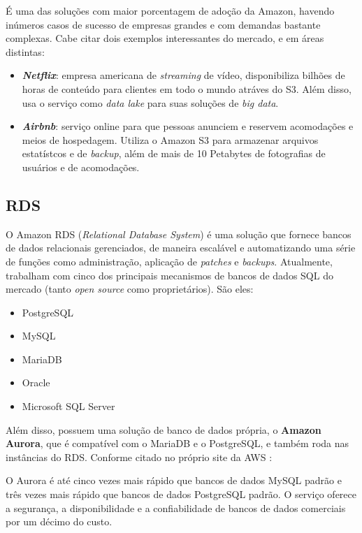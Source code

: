 É uma das soluções com maior porcentagem de adoção da Amazon, havendo inúmeros casos de sucesso de empresas grandes e com demandas bastante complexas. Cabe citar dois exemplos interessantes do mercado, e em áreas distintas: 
\begin{itemize}
  \item{\textit{\textbf{Netflix}}: empresa americana de \textit{streaming} de vídeo, disponibiliza bilhões de horas de conteúdo para clientes em todo o mundo atráves do S3. Além disso, usa o serviço como \textit{data lake} para suas soluções de \textit{big data}}.
  \item{\textit{\textbf{Airbnb}}: serviço online para que pessoas anunciem e reservem acomodações e meios de hospedagem. Utiliza o Amazon S3 para armazenar arquivos estatístcos e de \textit{backup}, além de mais de 10 Petabytes de fotografias de usuários e de acomodações.}
\end{itemize}

\subsection{RDS}

O Amazon RDS (\textit{Relational Database System}) é uma solução que fornece bancos de dados relacionais gerenciados, de maneira escalável e automatizando uma série de funções como administração, aplicação de \textit{patches} e \textit{backups}. Atualmente, trabalham com cinco dos principais mecanismos de bancos de dados SQL do mercado (tanto \textit{open source} como proprietários). São eles: 

\begin{itemize}
  \item{PostgreSQL}
  \item{MySQL}
  \item{MariaDB}
  \item{Oracle}
  \item{Microsoft SQL Server}
\end{itemize}

Além disso, possuem uma solução de banco de dados própria, o \textbf{Amazon Aurora}, que é compatível com o MariaDB e o PostgreSQL, e também roda nas instâncias do RDS. Conforme citado no próprio site da AWS \cite{aws-aurora}:

\begin{citacaoLonga}
O Aurora é até cinco vezes mais rápido que bancos de dados MySQL padrão e três vezes mais rápido que bancos de dados PostgreSQL padrão. O serviço oferece a segurança, a disponibilidade e a confiabilidade de bancos de dados comerciais por um décimo do custo.
\end{citacaoLonga}

